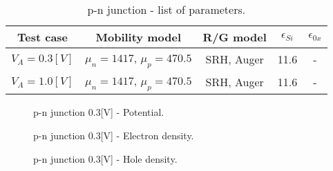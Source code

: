 \begin{table}[!h]
\centering
\begin{tabular}{ccccc}
\toprule
 Test case & Mobility model & R/G model & $\epsilon_{Si}$ & $\epsilon_{0x}$  \\
\midrule
$V_A=0.3 [V]$ & $\mu_n = 1417$, $\mu_p = 470.5$ & SRH, Auger & 11.6 & - \\
$V_A=1.0 [V]$ & $\mu_n = 1417$, $\mu_p = 470.5$ & SRH, Auger & 11.6 & - \\\bottomrule
\end{tabular}
\caption{p-n junction - list of parameters.}
\label{tab: diode direct}
\end{table}



\clearpage 

\begin{figure}[!h]
\centering
{}
\hspace{1cm}
\caption{p-n junction 0.3[V] - Potential.}
\label{fig: diode potential 03V}
\end{figure}

\vspace{1cm}

\begin{figure}[!h]
\centering
{}
\hspace{1cm}
\caption{p-n junction 0.3[V] -  Electron density.}
\label{fig: ndensity 03V}
\end{figure}

\vspace{1cm}

\begin{figure}[!h]
\centering
{}
\hspace{1cm}
\caption{p-n junction 0.3[V] - Hole density.}
\label{fig: pdensity 03V}
\end{figure}


\clearpage

